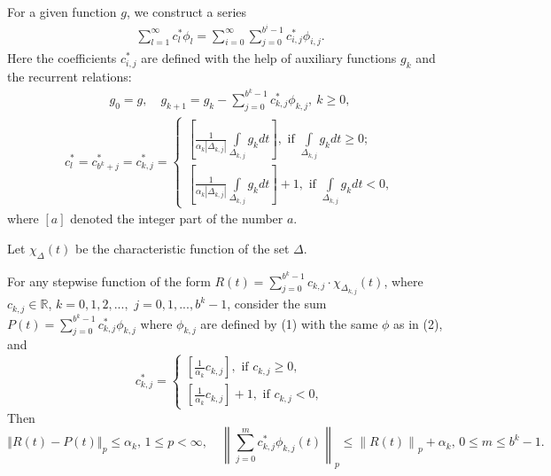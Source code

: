 \documentclass[
11pt,%
tightenlines,%
twoside,%
onecolumn,%
nofloats,%
nobibnotes,%
nofootinbib,%
superscriptaddress,%
noshowpacs,%
centertags]%
{revtex4}
\begin{document}
For a given function $g$, we construct a series
\begin{eqnarray}
    \sum_{l=1}^{\infty}c^{\ast}_l \phi_l= \sum_{i=0}^{\infty}\sum_{j=0}^{b^i-1} c^{\ast}_{i,j} \phi_{i,j}.
\end{eqnarray}
Here the coefficients $c^{\ast}_{i,j}$ are defined with the help
of auxiliary functions $g_k$ and the recurrent relations:
\begin{eqnarray}
g_0=g,\quad g_{k+1}=g_k- \sum_{j=0}^{b^k-1} c^{\ast}_{k,j} \phi_{k,j},\ k\ge0,
\end{eqnarray}
\begin{eqnarray}
c^{\ast}_l=c^{\ast}_{b^k+j} = c^{\ast}_{k,j}=
\left\{\begin{array}{rcl}
\left[
\frac{1}{\alpha_k\left\vert\Delta_{k,j}\right\vert}\int\limits_{\Delta_{k,j}} g_{k} dt
\right] , \mbox { if }
\int\limits_{\Delta_{k,j}    } g_{k} dt  \ge 0   ; \\
\left[
\frac{1}{\alpha_k\left\vert\Delta_{k,j}\right\vert}\int\limits_{\Delta_{k,j}}
g_{k} dt\right] +1, \mbox{ if } \int\limits_{\Delta_{k,j}} g_{k}
dt < 0,
\end{array}
\right.
\end{eqnarray}
where $[a]$ denoted the integer part of the number $a$.

Let $ \chi _ {\Delta} (t) $ be the characteristic function of the
set $ \Delta $.\medskip
\begin{lemma} %
     For any stepwise function of the form $
    R(t)=\sum_{j=0}^{b^k-1} c_{k,j} \cdot \chi_{\Delta_{k,j}}(t) $,
    where $  c_{k,j} \in\mathbb{ R}$,
    $k=0,1,2,...,$ $j=0,1,...,b^k-1$, consider the sum $P(t)=
    \sum_{j=0}^{b^k-1} c^{\ast}_{k,j} \phi_{k,j}$ where  $\phi_{k,j}$
    are defined by (1) with the same  $\phi$ as in (2), and
    $$
    c^{\ast}_{k,j}=\left\{\begin{array}{rcl}
    \left[\frac{1}{\alpha_k} c_{k,j}\right], \mbox { if }
    c_{k,j} \ge 0, \\
    \left[\frac{1}{\alpha_k} c_{k,j}\right]+1, \mbox{ if }c_{k,j}<0 ,
    \end{array}
    \right.
    $$
    Then
    $$
    \left\Vert R(t)-P(t)\right\Vert_p \le \alpha_k, \, 1\le p <
    \infty,\quad
    \left\|  \sum_{j=0}^{m} c_{k,j}^{\ast} \phi_{k,j}(t) \right\|_p \le
    \left\| R(t)\right\|_p + \alpha_k, \, 0\le  m \le b^k-1.
    $$
\end{lemma}
\end{document}
